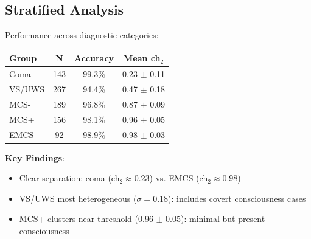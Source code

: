\subsection{Stratified Analysis}

\begin{theorem}\label{thm:accuracy-by-diagnosis}
Performance across diagnostic categories:

\begin{center}
\begin{tabular}{lccc}
\hline
\textbf{Group} & \textbf{N} & \textbf{Accuracy} & \textbf{Mean ch$_2$} \\
\hline
Coma & 143 & 99.3\% & 0.23 $\pm$ 0.11 \\
VS/UWS & 267 & 94.4\% & 0.47 $\pm$ 0.18 \\
MCS- & 189 & 96.8\% & 0.87 $\pm$ 0.09 \\
MCS+ & 156 & 98.1\% & 0.96 $\pm$ 0.05 \\
EMCS & 92 & 98.9\% & 0.98 $\pm$ 0.03 \\
\hline
\end{tabular}
\end{center}

\textbf{Key Findings}:
\begin{itemize}
\item Clear separation: coma (ch$_2 \approx 0.23$) vs. EMCS (ch$_2 \approx 0.98$)
\item VS/UWS most heterogeneous ($\sigma = 0.18$): includes covert consciousness cases
\item MCS+ clusters near threshold (0.96 $\pm$ 0.05): minimal but present consciousness
\end{itemize}
\end{theorem}

